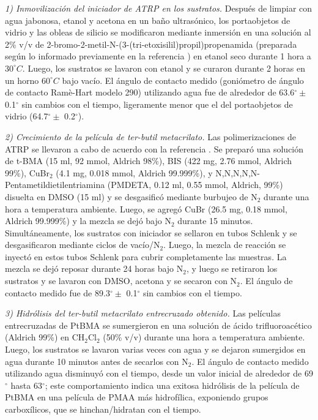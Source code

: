\emph{1) Inmovilizaci\'on del iniciador de ATRP en los sustratos.}
 Despu\'es de limpiar con agua jabonosa, etanol y acetona en un ba\~no ultras\'onico, los portaobjetos de vidrio y las obleas de silicio se modificaron mediante inmersi\'on en una soluci\'on al 2\% v/v de 2-bromo-2-metil-N-(3-(tri-etoxisilil)propil)propenamida (preparada seg\'un lo informado previamente en la referencia \cite{Yameen2008}) en etanol seco durante 1 hora a $30^\circ C$. Luego, los sustratos se lavaron con etanol y se curaron durante 2 horas en un horno $60^\circ C$ bajo vac\'io. El \'angulo de contacto medido (goni\'ometro de \'angulo de contacto Ramè-Hart modelo 290) utilizando agua fue de alrededor de 63.6$^\circ \pm $0.1$^\circ$ sin cambios con el tiempo, ligeramente menor que el del portaobjetos de vidrio (64.7$^\circ \pm$ 0.2$^\circ$).%




\emph{2) Crecimiento de la pel\'icula de ter-butil metacrilato.}
 Las polimerizaciones de ATRP se llevaron a cabo de acuerdo con la referencia \cite{Brown2009}. Se prepar\'o una soluci\'on de t-BMA (15 ml, 92 mmol, Aldrich 98\%), BIS (422 mg, 2.76 mmol, Aldrich 99\%), CuBr$_2$ (4.1 mg, 0.018 mmol, Aldrich 99.999\%), y N,N,N,N,N-Pentametildietilentriamina (PMDETA, 0.12 ml, 0.55 mmol, Aldrich, 99\%) disuelta en DMSO (15 ml) y se desgasific\'o mediante burbujeo de N$_2$ durante una hora a temperatura ambiente. Luego, se agreg\'o CuBr (26.5 mg, 0.18 mmol, Aldrich 99.999\%) y la mezcla se dej\'o bajo N$_2$ durante 15 minutos. Simult\'aneamente, los sustratos con iniciador se sellaron en tubos Schlenk y se desgasificaron mediante ciclos de vac\'io/N$_2$. Luego, la mezcla de reacci\'on se inyect\'o en estos tubos Schlenk para cubrir completamente las muestras. La mezcla se dej\'o reposar durante 24 horas bajo N$_2$, y luego se retiraron los sustratos y se lavaron con DMSO, acetona y se secaron con N$_2$. El \'angulo de contacto medido fue de 89.3$^\circ \pm$ 0.1$^\circ$ sin cambios con el tiempo.

\emph{3) Hidr\'olisis del ter-butil metacrilato entrecruzado obtenido.}
 Las pel\'iculas entrecruzadas de PtBMA se sumergieron en una soluci\'on de \'acido trifluoroac\'etico (Aldrich 99\%) en CH$_2$Cl$_2$ (50\% v/v) durante una hora a temperatura ambiente. Luego, los sustratos se lavaron varias veces con agua y se dejaron sumergidos en agua durante 10 minutos antes de secarlos con N$_2$. El \'angulo de contacto medido utilizando agua disminuy\'o con el tiempo, desde un valor inicial de alrededor de 69$^\circ$ hasta 63$^\circ$; este comportamiento indica una exitosa hidr\'olisis de la pel\'icula de PtBMA en una pel\'icula de PMAA m\'as hidrof\'ilica, exponiendo grupos carbox\'ilicos, que se hinchan/hidratan con el tiempo.


